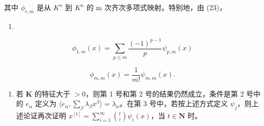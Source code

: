 其中 \(\phi_{r,m}\) 是从 \(K^{n}\) 到 \(K^{n}\) 的 m 次齐次多项式映射。特别地，由 (23)，

\begin{enumerate}
\def\labelenumi{(\arabic{enumi})}
\setcounter{enumi}{24}
\tightlist
\item
\end{enumerate}

\[
\phi_ {1, m} (x) = \sum_ {p \leqslant m} \frac {(- 1) ^ {p - 1}}{p} \psi_ {p, m} (x)\tag{25}
\]

\[
\phi_ {m, m} (x) = \frac {1}{m !} \psi_ {m, m} (x).\tag{26}
\]

\begin{enumerate}
\def\labelenumi{(\arabic{enumi})}
\setcounter{enumi}{4}
\tightlist
\item
  若 \(\mathbf{K}\) 的特征大于 \(>0\)，则第 1 号和第 2 号的结果仍然成立，条件是第 2 号中的 \(e_{\alpha}\) 定义为 \(\langle e_{\alpha}, \sum_{\beta} \lambda_{\beta} x^{\beta} \rangle = \lambda_{\alpha}\)。在第 3 号中，若按上述方式定义 \(\psi_j\)，则上述论证再次证明 \(x^{[t]} = \sum_{i=1}^{\infty} \binom{t}{i} \psi_i(x)\)，当 \(t \in \mathbf{N}\) 时。
\end{enumerate}

